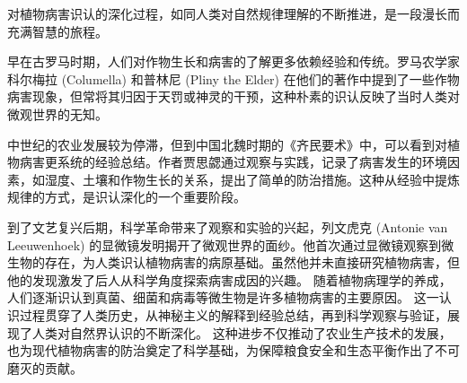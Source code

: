 \documentclass[AutoFakeBold]{LZUThesis-PgD&PhD}
\begin{document}
	
	对植物病害识认的深化过程，如同人类对自然规律理解的不断推进，是一段漫长而充满智慧的旅程。

	早在古罗马时期，人们对作物生长和病害的了解更多依赖经验和传统。罗马农学家科尔梅拉 (Columella) 和普林尼 (Pliny the Elder) 在他们的著作中提到了一些作物病害现象，但常将其归因于天罚或神灵的干预，这种朴素的识认反映了当时人类对微观世界的无知\cite{columella1941agriculture}。
	
	中世纪的农业发展较为停滞，但到中国北魏时期的《齐民要术》中，可以看到对植物病害更系统的经验总结。作者贾思勰通过观察与实践，记录了病害发生的环境因素，如湿度、土壤和作物生长的关系，提出了简单的防治措施\cite{jia535qimin}。这种从经验中提炼规律的方式，是识认深化的一个重要阶段。
	
	到了文艺复兴后期，科学革命带来了观察和实验的兴起，列文虎克 (Antonie van Leeuwenhoek) 的显微镜发明揭开了微观世界的面纱。他首次通过显微镜观察到微生物的存在，为人类识认植物病害的病原基础。虽然他并未直接研究植物病害，但他的发现激发了后人从科学角度探索病害成因的兴趣\cite{leeuwenhoek1683observations}。
	随着植物病理学的养成，人们逐渐识认到真菌、细菌和病毒等微生物是许多植物病害的主要原因\cite{agrios2005plant}。
	这一认识过程贯穿了人类历史，从神秘主义的解释到经验总结，再到科学观察与验证，展现了人类对自然界认识的不断深化。
	这种进步不仅推动了农业生产技术的发展，也为现代植物病害的防治奠定了科学基础，为保障粮食安全和生态平衡作出了不可磨灭的贡献。
	
\end{document}
